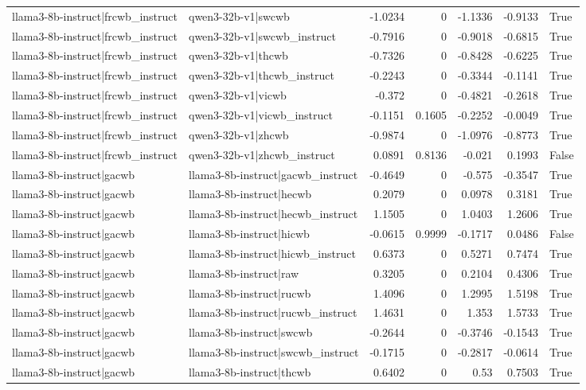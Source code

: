 \begin{table}
\begin{tabular}{l l r r r r l}
llama3-8b-instruct|frcwb_instruct & qwen3-32b-v1|swcwb & -1.0234 & 0 & -1.1336 & -0.9133 & True \\
llama3-8b-instruct|frcwb_instruct & qwen3-32b-v1|swcwb_instruct & -0.7916 & 0 & -0.9018 & -0.6815 & True \\
llama3-8b-instruct|frcwb_instruct & qwen3-32b-v1|thcwb & -0.7326 & 0 & -0.8428 & -0.6225 & True \\
llama3-8b-instruct|frcwb_instruct & qwen3-32b-v1|thcwb_instruct & -0.2243 & 0 & -0.3344 & -0.1141 & True \\
llama3-8b-instruct|frcwb_instruct & qwen3-32b-v1|vicwb & -0.372 & 0 & -0.4821 & -0.2618 & True \\
llama3-8b-instruct|frcwb_instruct & qwen3-32b-v1|vicwb_instruct & -0.1151 & 0.1605 & -0.2252 & -0.0049 & True \\
llama3-8b-instruct|frcwb_instruct & qwen3-32b-v1|zhcwb & -0.9874 & 0 & -1.0976 & -0.8773 & True \\
llama3-8b-instruct|frcwb_instruct & qwen3-32b-v1|zhcwb_instruct & 0.0891 & 0.8136 & -0.021 & 0.1993 & False \\
llama3-8b-instruct|gacwb & llama3-8b-instruct|gacwb_instruct & -0.4649 & 0 & -0.575 & -0.3547 & True \\
llama3-8b-instruct|gacwb & llama3-8b-instruct|hecwb & 0.2079 & 0 & 0.0978 & 0.3181 & True \\
llama3-8b-instruct|gacwb & llama3-8b-instruct|hecwb_instruct & 1.1505 & 0 & 1.0403 & 1.2606 & True \\
llama3-8b-instruct|gacwb & llama3-8b-instruct|hicwb & -0.0615 & 0.9999 & -0.1717 & 0.0486 & False \\
llama3-8b-instruct|gacwb & llama3-8b-instruct|hicwb_instruct & 0.6373 & 0 & 0.5271 & 0.7474 & True \\
llama3-8b-instruct|gacwb & llama3-8b-instruct|raw & 0.3205 & 0 & 0.2104 & 0.4306 & True \\
llama3-8b-instruct|gacwb & llama3-8b-instruct|rucwb & 1.4096 & 0 & 1.2995 & 1.5198 & True \\
llama3-8b-instruct|gacwb & llama3-8b-instruct|rucwb_instruct & 1.4631 & 0 & 1.353 & 1.5733 & True \\
llama3-8b-instruct|gacwb & llama3-8b-instruct|swcwb & -0.2644 & 0 & -0.3746 & -0.1543 & True \\
llama3-8b-instruct|gacwb & llama3-8b-instruct|swcwb_instruct & -0.1715 & 0 & -0.2817 & -0.0614 & True \\
llama3-8b-instruct|gacwb & llama3-8b-instruct|thcwb & 0.6402 & 0 & 0.53 & 0.7503 & True \\

\end{tabular}
\end{table}
